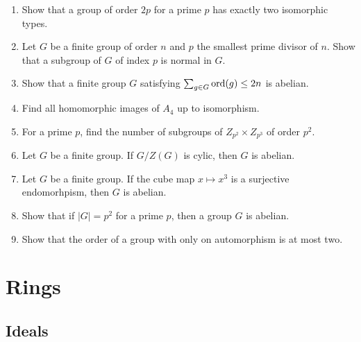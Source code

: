 \documentclass{../../large}
\begin{document}
\begin{enumerate}
\item Show that a group of order $2p$ for a prime $p$ has exactly two isomorphic types.
\item Let $G$ be a finite group of order $n$ and $p$ the smallest prime divisor of $n$. Show that a subgroup of $G$ of index $p$ is normal in $G$.
\item Show that a finite group $G$ satisfying $\sum_{g\in G}\operatorname{ord}(g)\le2n$ is abelian.
\item Find all homomorphic images of $A_4$ up to isomorphism.
\item For a prime $p$, find the number of subgroups of $Z_{p^2}\times Z_{p^3}$ of order $p^2$.
\item Let $G$ be a finite group. If $G/Z(G)$ is cylic, then $G$ is abelian.
\item Let $G$ be a finite group. If the cube map $x\mapsto x^3$ is a surjective endomorhpism, then $G$ is abelian.
\item Show that if $|G|=p^2$ for a prime $p$, then a group $G$ is abelian.
\item Show that the order of a group with only on automorphism is at most two.
\end{enumerate}










\part{Rings}
\chapter{Ideals}
\end{document}
